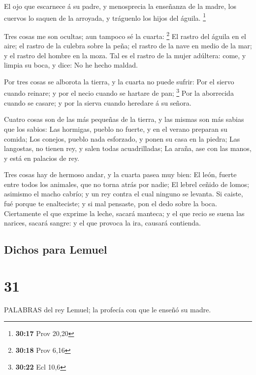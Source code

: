  El ojo que escarnece á su padre, y menosprecia la
enseñanza de la madre, los cuervos lo saquen de la arroyada, y tráguenlo
los hijos del águila. \footnote{\textbf{30:17} Prov 20,20}

 Tres cosas me son ocultas; aun tampoco sé la cuarta:
\footnote{\textbf{30:18} Prov 6,16}  El rastro del águila
en el aire; el rastro de la culebra sobre la peña; el rastro de la nave
en medio de la mar; y el rastro del hombre en la moza.  Tal
es el rastro de la mujer adúltera: come, y limpia su boca, y dice: No he
hecho maldad.

 Por tres cosas se alborota la tierra, y la cuarta no puede
sufrir:  Por el siervo cuando reinare; y por el necio
cuando se hartare de pan; \footnote{\textbf{30:22} Ecl 10,6}
 Por la aborrecida cuando se casare; y por la sierva cuando
heredare á su señora.

 Cuatro cosas son de las más pequeñas de la tierra, y las
mismas son más sabias que los sabios:  Las hormigas, pueblo
no fuerte, y en el verano preparan su comida;  Los conejos,
pueblo nada esforzado, y ponen su casa en la piedra;  Las
langostas, no tienen rey, y salen todas acuadrilladas;  La
araña, ase con las manos, y está en palacios de rey.

 Tres cosas hay de hermoso andar, y la cuarta pasea muy
bien:  El león, fuerte entre todos los animales, que no
torna atrás por nadie;  El lebrel ceñido de lomos; asimismo
el macho cabrío; y un rey contra el cual ninguno se levanta.
 Si caiste, fué porque te enalteciste; y si mal pensaste,
pon el dedo sobre la boca.  Ciertamente el que exprime la
leche, sacará manteca; y el que recio se suena las narices, sacará
sangre: y el que provoca la ira, causará contienda.

\hypertarget{dichos-para-lemuel}{%
\subsection{Dichos para Lemuel}\label{dichos-para-lemuel}}

\hypertarget{section-30}{%
\section{31}\label{section-30}}

 PALABRAS del rey Lemuel; la profecía con que le enseñó su
madre.

